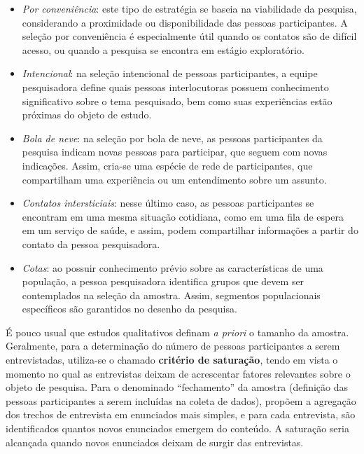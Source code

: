 \documentclass[12pt, a4paper, openany]{book}
\begin{document}
\begin{itemize}
\item \textit{Por conveni\^encia}: este tipo de estrat\'egia se baseia na viabilidade da pesquisa, considerando a proximidade ou disponibilidade das pessoas participantes. A sele\c{c}\~ao por conveni\^encia \'e especialmente \'util quando os contatos s\~ao de dif\'icil acesso, ou quando a pesquisa se encontra em est\'agio explorat\'orio.
\item \textit{Intencional}: na sele\c{c}\~ao intencional de pessoas participantes, a equipe pesquisadora define quais pessoas interlocutoras possuem conhecimento significativo sobre o tema pesquisado, bem como suas experi\^encias est\~ao pr\'oximas do objeto de estudo.
\item \textit{Bola de neve}: na sele\c{c}\~ao por bola de neve, as pessoas participantes da pesquisa indicam novas pessoas para participar, que seguem com novas indica\c{c}\~oes. Assim, cria-se uma esp\'ecie de rede de participantes, que compartilham uma experi\^encia ou um entendimento sobre um assunto.
\item \textit{Contatos intersticiais}: nesse \'ultimo caso, as pessoas participantes se encontram em uma mesma situa\c{c}\~ao cotidiana, como em uma fila de espera em um servi\c{c}o de sa\'ude, e assim, podem compartilhar informa\c{c}\~oes a partir do contato da pessoa pesquisadora.
\item \textit{Cotas}: ao possuir conhecimento pr\'evio sobre as caracter\'isticas de uma popula\c{c}\~ao, a pessoa pesquisadora identifica grupos que devem ser contemplados na sele\c{c}\~ao da amostra. Assim, segmentos populacionais espec\'ificos s\~ao garantidos no desenho da pesquisa.
\end{itemize}

\'E pouco usual que estudos qualitativos definam \textit{a priori} o tamanho da amostra. Geralmente, para a determina\c{c}\~ao do n\'umero de pessoas participantes a serem entrevistadas, utiliza-se o chamado \textbf{crit\'erio de satura\c{c}\~ao}, tendo em vista o momento no qual as entrevistas deixam de acrescentar fatores relevantes sobre o objeto de pesquisa. Para o denominado ``fechamento'' da amostra (defini\c{c}\~ao das pessoas participantes a serem inclu\'idas na coleta de dados), \citet{fontanella2011amostragem} prop\~oem a agrega\c{c}\~ao dos trechos de entrevista em enunciados mais simples, e para cada entrevista, s\~ao identificados quantos novos enunciados emergem do conte\'udo. A satura\c{c}\~ao seria alcan\c{c}ada quando novos enunciados deixam de surgir das entrevistas.
\end{document}
